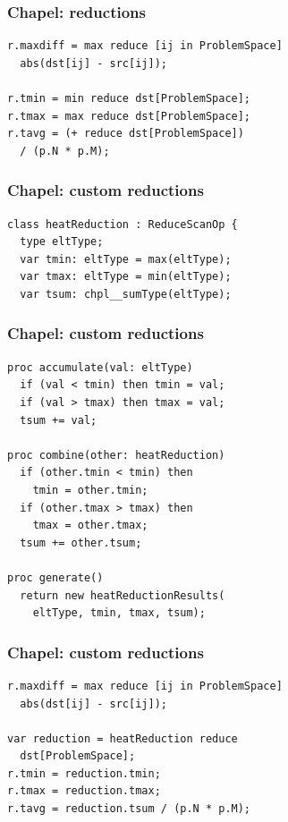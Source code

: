 \documentclass{beamer}
\begin{document}
\begin{frame}[fragile]
 \frametitle{Chapel: reductions}
\begin{verbatim}
r.maxdiff = max reduce [ij in ProblemSpace]
  abs(dst[ij] - src[ij]);

r.tmin = min reduce dst[ProblemSpace];
r.tmax = max reduce dst[ProblemSpace];
r.tavg = (+ reduce dst[ProblemSpace])
  / (p.N * p.M);
\end{verbatim}
\end{frame}

\begin{frame}[fragile]
 \frametitle{Chapel: custom reductions}
\begin{verbatim}
class heatReduction : ReduceScanOp {
  type eltType;
  var tmin: eltType = max(eltType);
  var tmax: eltType = min(eltType);
  var tsum: chpl__sumType(eltType);
\end{verbatim}
\end{frame}

\begin{frame}[fragile]
 \frametitle{Chapel: custom reductions}
\begin{verbatim}
proc accumulate(val: eltType)
  if (val < tmin) then tmin = val;
  if (val > tmax) then tmax = val;
  tsum += val;

proc combine(other: heatReduction)
  if (other.tmin < tmin) then
    tmin = other.tmin;
  if (other.tmax > tmax) then
    tmax = other.tmax;
  tsum += other.tsum;

proc generate()
  return new heatReductionResults(
    eltType, tmin, tmax, tsum);
\end{verbatim}
\end{frame}

\begin{frame}[fragile]
 \frametitle{Chapel: custom reductions}
\begin{verbatim}
r.maxdiff = max reduce [ij in ProblemSpace]
  abs(dst[ij] - src[ij]);

var reduction = heatReduction reduce
  dst[ProblemSpace];
r.tmin = reduction.tmin;
r.tmax = reduction.tmax;
r.tavg = reduction.tsum / (p.N * p.M);
\end{verbatim}
\end{frame}
\end{document}
